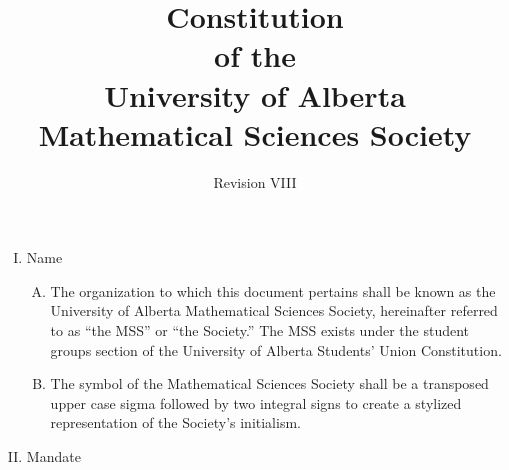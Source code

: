 \documentclass[11pt]{article}
\title{Constitution \\
of the\\
University of Alberta\\
Mathematical Sciences Society\\
}
\author{Revision VIII}
\begin{document}
\maketitle

\begin{enumerate}[I.]
  \item Name
    \begin{enumerate}[A)]
      \item The organization to which this document pertains shall be known as
        the University of Alberta Mathematical Sciences Society, hereinafter
        referred to as ``the MSS'' or ``the Society.'' The MSS exists under the
        student groups section of the University of Alberta Students' Union
        Constitution.
      \item The symbol of the Mathematical Sciences Society shall be a
        transposed upper case sigma followed by two integral signs to create a
        stylized representation of the Society's initialism.
      \end{enumerate}
  \item Mandate


\end{enumerate}
\end{document}

